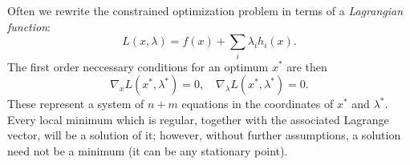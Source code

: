 \documentclass{article}
\begin{document}





\label{s:lagrangian-function}

Often we rewrite the constrained optimization problem in terms of a \emph{Lagrangian function}:
\begin{equation*}
  L(x, \lambda) = f(x) + \sum_i \lambda_i h_i(x).
\end{equation*}
The first order neccessary conditions for an optimum \(x^*\) are then
\begin{equation*}
  \nabla_x L(x^*, \lambda^*) = 0, \quad \nabla_\lambda L(x^*, \lambda^*) = 0.
\end{equation*}
These represent a system of \(n + m\) equations in the coordinates of \(x^*\) and \(\lambda^*\).
Every local minimum which is regular, together with the associated Lagrange vector, will be a
solution of it; however, without further assumptions, a solution need not be a minimum (it can be
any stationary point).
\end{document}
